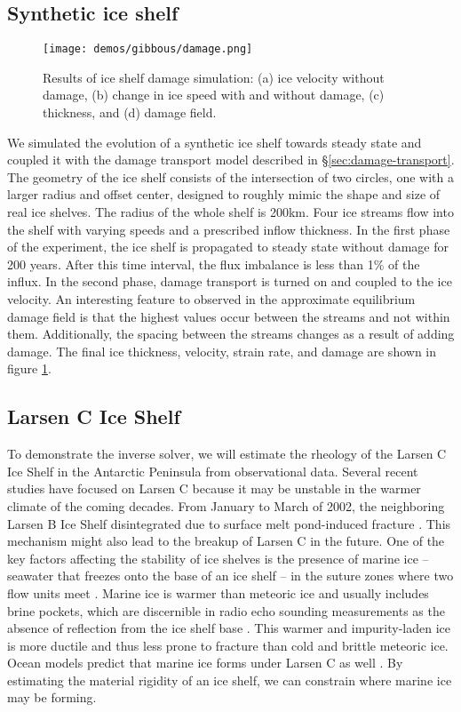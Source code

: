 \documentclass{article}
\theoremstyle{definition}
\theoremstyle{plain}
\begin{document}
\subsection{Synthetic ice shelf}

\begin{figure}[h]
    \texttt{[image: demos/gibbous/damage.png]}
    \caption{Results of ice shelf damage simulation: (a) ice velocity without damage, (b) change in ice speed with and without damage, (c) thickness, and (d) damage field.}
    \label{fig:damage}
\end{figure}

We simulated the evolution of a synthetic ice shelf towards steady state and coupled it with the damage transport model described in \S\ref{sec:damage-transport}.
The geometry of the ice shelf consists of the intersection of two circles, one with a larger radius and offset center, designed to roughly mimic the shape and size of real ice shelves.
The radius of the whole shelf is 200km.
Four ice streams flow into the shelf with varying speeds and a prescribed inflow thickness.
In the first phase of the experiment, the ice shelf is propagated to steady state without damage for 200 years.
After this time interval, the flux imbalance is less than 1\% of the influx.
In the second phase, damage transport is turned on and coupled to the ice velocity.
An interesting feature to observed in the approximate equilibrium damage field is that the highest values occur between the streams and not within them.
Additionally, the spacing between the streams changes as a result of adding damage.
The final ice thickness, velocity, strain rate, and damage are shown in figure \ref{fig:damage}.


\subsection{Larsen C Ice Shelf}

To demonstrate the inverse solver, we will estimate the rheology of the Larsen C Ice Shelf in the Antarctic Peninsula from observational data.
Several recent studies have focused on Larsen C because it may be unstable in the warmer climate of the coming decades.
From January to March of 2002, the neighboring Larsen B Ice Shelf disintegrated due to surface melt pond-induced fracture \citep{banwell2013breakup}.
This mechanism might also lead to the breakup of Larsen C in the future.
One of the key factors affecting the stability of ice shelves is the presence of marine ice -- seawater that freezes onto the base of an ice shelf -- in the suture zones where two flow units meet \citep{kulessa2014marine}.
Marine ice is warmer than meteoric ice and usually includes brine pockets, which are discernible in radio echo sounding measurements as the absence of reflection from the ice shelf base \citep{holland2009marine}.
This warmer and impurity-laden ice is more ductile and thus less prone to fracture than cold and brittle meteoric ice.
Ocean models predict that marine ice forms under Larsen C as well \citep{holland2009marine}.
By estimating the material rigidity of an ice shelf, we can constrain where marine ice may be forming.
\end{document}
